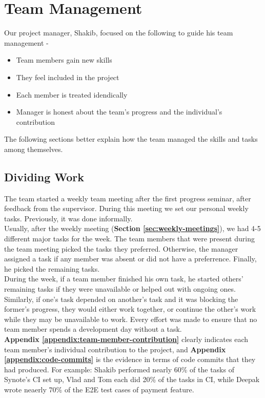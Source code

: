 \section{Team Management}
\label{sec:people-management}
Our project manager, Shakib, focused on the following to guide his team management \cite{iansommerville2011}-

\begin{itemize}

  \item Team members gain new skills
  \item They feel included in the project
  \item Each member is treated idendically
  \item Manager is honest about the team's progress and the individual's contribution

\end{itemize}

The following sections better explain how the team managed the skills and tasks among themselves.

\subsection{Dividing Work}
\label{subsec:dividing-work}
The team started a weekly team meeting after the first progress seminar, after feedback from the supervisor. During this meeting we set our personal weekly tasks. Previously, it was done informally.\\

Usually, after the weekly meeting (\textbf{Section \ref{sec:weekly-meetings}}), we had 4-5 different major tasks for the week. The team members that were present during the team meeting picked the tasks they preferred. Otherwise, the manager assigned a task if any member was absent or did not have a preferrence. Finally, he picked the remaining tasks.\\

During the week, if a team member finished his own task, he started others' remaining tasks if they were unavailable or helped out with ongoing ones. Similarly, if one's task depended on another's task and it was blocking the former's progress, they would either work together, or continue the other's work while they may be unavailable to work. Every effort was made to ensure that no team member spends a development day without a task.\\

\textbf{Appendix \ref{appendix:team-member-contribution}} clearly indicates each team member's individual contribution to the project, and \textbf{Appendix \ref{appendix:code-commits}} is the evidence in terms of code commits that they had produced. For example: Shakib performed nearly 60\% of the tasks of Synote's CI set up, Vlad and Tom each did 20\% of the tasks in CI, while Deepak wrote neaerly 70\% of the E2E test cases of payment feature.\\

